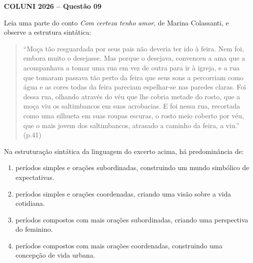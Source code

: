 \textbf{COLUNI 2026 -- Questão 09}\par\medskip Leia uma parte do conto \textit{Com certeza tenho amor}, de Marina Colassanti, e observe a estrutura sintática:

\begin{quote}“Moça tão resguardada por seus pais não deveria ter ido à feira. Nem foi, embora muito o desejasse. Mas porque o desejava, convenceu a ama que a acompanhava a tomar uma rua em vez de outra para ir à igreja, e a rua que tomaram passava tão perto da feira que seus sons a percorriam como água e as cores todas da feira pareciam espelhar-se nas paredes claras. Foi dessa rua, olhando através do véu que lhe cobria metade do rosto, que a moça viu os saltimbancos em suas acrobacias. E foi nessa rua, recortada como uma silhueta em suas roupas escuras, o rosto meio coberto por véu, que o mais jovem dos saltimbancos, atrasado a caminho da feira, a viu.” (p.41)\end{quote}

Na estruturação sintática da linguagem do excerto acima, há predominância de:
\begin{enumerate}
\item períodos simples e orações subordinadas, construindo um mundo simbólico de expectativas.
\item períodos simples e orações coordenadas, criando uma visão sobre a vida cotidiana.
\item períodos compostos com mais orações subordinadas, criando uma perspectiva do feminino.
\item períodos compostos com mais orações coordenadas, construindo uma concepção de vida urbana.
\end{enumerate}
